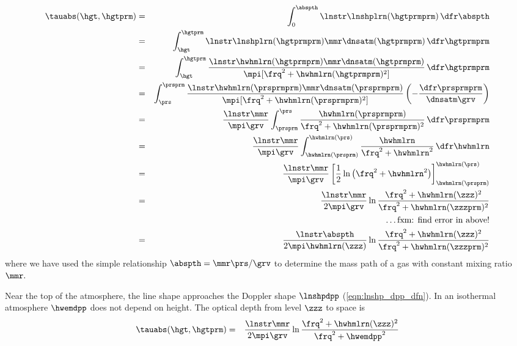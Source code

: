 \documentclass[12pt]{article}
\begin{document}
\begin{eqnarray}
\tauabs(\hgt,\hgtprm)
& = & \int_{0}^{\abspth} \lnstr \lnshplrn(\hgtprmprm) \,\dfr\abspth
\nonumber \\
& = & \int_{\hgt}^{\hgtprm} \lnstr \lnshplrn(\hgtprmprm) \mmr \dnsatm(\hgtprmprm)
\,\dfr\hgtprmprm \nonumber \\
& = & \int_{\hgt}^{\hgtprm} 
\frac{\lnstr \hwhmlrn(\hgtprmprm) \mmr \dnsatm(\hgtprmprm) }
{\mpi [ \frq^{2} + \hwhmlrn(\hgtprmprm)^{2} ] }
\,\dfr\hgtprmprm \nonumber \\
& = & \int_{\prs}^{\prsprm} 
\frac{\lnstr \hwhmlrn(\prsprmprm) \mmr \dnsatm(\prsprmprm) }
{\mpi [ \frq^{2} + \hwhmlrn(\prsprmprm)^{2} ] }
\left( -\frac{\dfr\prsprmprm}{\dnsatm \grv} \right) \nonumber \\
& = & \frac{\lnstr \mmr}{\mpi \grv} \int_{\prsprm}^{\prs} 
\frac{\hwhmlrn(\prsprmprm)}
{ \frq^{2} + \hwhmlrn(\prsprmprm)^{2} }
\,\dfr\prsprmprm \nonumber \\
& = & \frac{\lnstr \mmr}{\mpi \grv} \int_{\hwhmlrn(\prsprm)}^{\hwhmlrn(\prs)} 
\frac{\hwhmlrn}{ \frq^{2} + \hwhmlrn^{2} }
\,\dfr\hwhmlrn \nonumber \\
& = & \frac{\lnstr \mmr}{\mpi \grv} 
\left[
\frac{1}{2} \ln \left( \frq^{2} + \hwhmlrn^{2} \right) 
\right]_{\hwhmlrn(\prsprm)}^{\hwhmlrn(\prs)} \nonumber \\
& = & \frac{\lnstr \mmr}{2 \mpi \grv} 
\ln \frac{ \frq^{2} + \hwhmlrn(\zzz)^{2} }
{ \frq^{2} + \hwhmlrn(\zzzprm)^{2} } \nonumber \\
& & \ldots \mbox{fxm: find error in above!} \nonumber \\
& = & \frac{\lnstr \abspth}{2 \mpi \hwhmlrn(\zzz)} 
\ln \frac{ \frq^{2} + \hwhmlrn(\zzz)^{2} }
{ \frq^{2} + \hwhmlrn(\zzzprm)^{2} }
\label{eqn:tau_ihg_lyr}
\end{eqnarray}
where we have used the simple relationship 
$\abspth = \mmr \prs / \grv$ to determine the mass path of a gas with
constant mixing ratio $\mmr.$ 

Near the top of the atmosphere, the line shape approaches the Doppler
shape $\lnshpdpp$ (\ref{eqn:lnshp_dpp_dfn}).
In an isothermal atmosphere $\hwemdpp$ does not depend on height.
The optical depth from level $\zzz$ to space is 
\begin{eqnarray}
\tauabs(\hgt,\hgtprm)
& = & \frac{\lnstr \mmr}{2 \mpi \grv} 
\ln \frac{ \frq^{2} + \hwhmlrn(\zzz)^{2} }
{ \frq^{2} + \hwemdpp^{2} }
\label{eqn:tau_ihg_toa}
\end{eqnarray}
\end{document}
